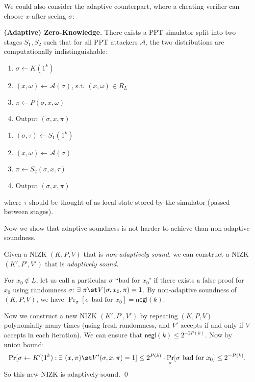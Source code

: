 \documentclass[12pt]{tufte-book}
\newcommand{\ma}{\mathcal{A}}
\begin{document}
We could also consider the adaptive counterpart, where a cheating verifier can
choose $x$ after seeing $\sigma$:

\medskip
\noindent\textbf{(Adaptive) Zero-Knowledge.}
    There exists a PPT simulator split into two stages $S_1, S_2$ such that
    for all PPT attackers $\ma$,
    the two distributions are computationally indistinguishable:

\medskip
\begin{minipage}{0.5\textwidth}
    \begin{enumerate}[itemsep=0pt]
        \item $\sigma \gets K(1^k)$
        \item $(x, \omega) \gets \ma(\sigma)$, s.t. $(x, \omega) \in R_L$
        \item $\pi \gets P(\sigma, x, \omega)$
        \item Output $(\sigma, x, \pi)$
    \end{enumerate}
\end{minipage}
\begin{minipage}{0.5\textwidth}
    \begin{enumerate}[itemsep=0pt]
        \item $(\sigma, \tau) \gets S_1(1^k)$
        \item $(x, \omega) \gets \ma(\sigma)$
        \item $\pi \gets S_2(\sigma, x, \tau)$
        \item Output $(\sigma, x, \pi)$
    \end{enumerate}
\end{minipage}

\medskip
\noindent where $\tau$ should be thought of as local state stored by the simulator (passed
    between stages).

\bigskip
Now we show that adaptive soundness is not harder to achieve than non-adaptive soundness.
\begin{theorem}\label{thm:amplify-soundness}
    Given a NIZK $(K, P, V)$ that is \emph{non-adaptively sound}, we can
    construct a NIZK $(K', P', V')$ that is \emph{adaptively sound}.
\end{theorem}
\proof
For $x_0 \not\in L$, let us call a particular $\sigma$ ``bad for $x_0$" if 
there exists a false proof for $x_0$ using randomness $\sigma$:
$\exists~ \pi \st V(\sigma, x_0, \pi) = 1$.
By non-adaptive soundness of $(K, P, V)$, we have
$\Pr_\sigma[\sigma \text{ bad for } x_0] = \mathsf{negl}(k)$.

Now we construct a new NIZK $(K',P',V')$ by repeating $(K,P,V)$ polynomially-many times
(using fresh randomness, and $V'$ accepts if and only if $V$ accepts in each iteration).
We can ensure that $\mathsf{negl}(k) \leq 2^{-2P(k)}$.
Now by union bound:
$$
\Pr[\sigma \gets K'(1^k): \exists~ (x, \pi) \st V'(\sigma, x, \pi) = 1] \leq
2^{P(k)}\cdot \Pr_\sigma[\sigma \text{ bad for } x_0] \leq 2^{-P(k)}.$$
So this new NIZK is adaptively-sound. \qed
\end{document}
